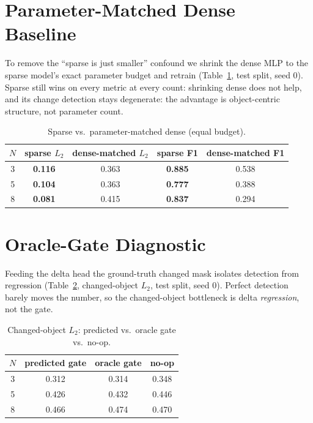 \documentclass[conference]{IEEEtran}
\begin{document}
\section{Parameter-Matched Dense Baseline}\label{app:matched}
To remove the ``sparse is just smaller'' confound we shrink the dense MLP to the sparse
model's exact parameter budget and retrain (Table~\ref{tab:matched}, test split, seed 0).
Sparse still wins on every metric at every count: shrinking dense does not help, and its
change detection stays degenerate: the advantage is object-centric structure, not
parameter count.

\begin{table}[h]
\caption{Sparse vs.\ parameter-matched dense (equal budget).}
\label{tab:matched}
\centering \footnotesize \setlength{\tabcolsep}{4pt}
\begin{tabular}{@{}ccccc@{}}
\toprule
$N$ & sparse $L_2$ & dense-matched $L_2$ & sparse F1 & dense-matched F1 \\
\midrule
3 & \textbf{0.116} & 0.363 & \textbf{0.885} & 0.538 \\
5 & \textbf{0.104} & 0.363 & \textbf{0.777} & 0.388 \\
8 & \textbf{0.081} & 0.415 & \textbf{0.837} & 0.294 \\
\bottomrule
\end{tabular}
\end{table}

\section{Oracle-Gate Diagnostic}\label{app:oracle}
Feeding the delta head the ground-truth changed mask isolates detection from regression
(Table~\ref{tab:oraclegate}, changed-object $L_2$, test split, seed 0). Perfect detection
barely moves the number, so the changed-object bottleneck is delta \emph{regression}, not
the gate.

\begin{table}[h]
\caption{Changed-object $L_2$: predicted vs.\ oracle gate vs.\ no-op.}
\label{tab:oraclegate}
\centering \footnotesize \setlength{\tabcolsep}{6pt}
\begin{tabular}{@{}cccc@{}}
\toprule
$N$ & predicted gate & oracle gate & no-op \\
\midrule
3 & 0.312 & 0.314 & 0.348 \\
5 & 0.426 & 0.432 & 0.446 \\
8 & 0.466 & 0.474 & 0.470 \\
\bottomrule
\end{tabular}
\end{table}
\end{document}
